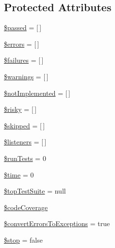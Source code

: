 \subsection*{Protected Attributes}
\begin{DoxyCompactItemize}
\item 
\mbox{\hyperlink{class_p_h_p_unit___framework___test_result_a36f815b75b2e9a2b312e4c61daf87e9a}{\$passed}} = \mbox{[}$\,$\mbox{]}
\item 
\mbox{\hyperlink{class_p_h_p_unit___framework___test_result_ab24faf4aa647cdcee494fc48524ad4ff}{\$errors}} = \mbox{[}$\,$\mbox{]}
\item 
\mbox{\hyperlink{class_p_h_p_unit___framework___test_result_ad511f4eeab6abd500279ac610b3cc78f}{\$failures}} = \mbox{[}$\,$\mbox{]}
\item 
\mbox{\hyperlink{class_p_h_p_unit___framework___test_result_a46209434b2ef1d7554dc5135de969432}{\$warnings}} = \mbox{[}$\,$\mbox{]}
\item 
\mbox{\hyperlink{class_p_h_p_unit___framework___test_result_aa4e3b466d5579fcd4bbbb9b7d2e3990d}{\$not\+Implemented}} = \mbox{[}$\,$\mbox{]}
\item 
\mbox{\hyperlink{class_p_h_p_unit___framework___test_result_a06dd16ff404a50a8a5956a5bec512fec}{\$risky}} = \mbox{[}$\,$\mbox{]}
\item 
\mbox{\hyperlink{class_p_h_p_unit___framework___test_result_a6a413fb7294de7b959542d9b02acafce}{\$skipped}} = \mbox{[}$\,$\mbox{]}
\item 
\mbox{\hyperlink{class_p_h_p_unit___framework___test_result_a980b440b9984f3e17e3824f0197f68a7}{\$listeners}} = \mbox{[}$\,$\mbox{]}
\item 
\mbox{\hyperlink{class_p_h_p_unit___framework___test_result_a013a3877b201ffbd1b498b21e99e402f}{\$run\+Tests}} = 0
\item 
\mbox{\hyperlink{class_p_h_p_unit___framework___test_result_a78db1a0602e3b6ac1d9a1b5ec103c160}{\$time}} = 0
\item 
\mbox{\hyperlink{class_p_h_p_unit___framework___test_result_a5f8a35c3f7fa2b077816b0164c334291}{\$top\+Test\+Suite}} = null
\item 
\mbox{\hyperlink{class_p_h_p_unit___framework___test_result_a01e2d18e1e592c8f95f6418ea6ace2d9}{\$code\+Coverage}}
\item 
\mbox{\hyperlink{class_p_h_p_unit___framework___test_result_ad2a48c37b4e6c0c9f55cc841052b415d}{\$convert\+Errors\+To\+Exceptions}} = true
\item 
\mbox{\hyperlink{class_p_h_p_unit___framework___test_result_afec7403d7db1849b2bd2f3ce218f12a2}{\$stop}} = false

\end{DoxyCompactItemize}
